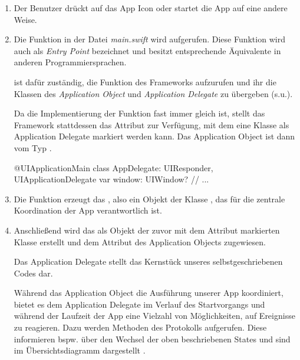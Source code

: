 \documentclass[parskip=half, final]{scrreprt}
\begin{document}
\begin{enumerate}
\item Der Benutzer drückt auf das App Icon oder startet die App auf eine andere Weise.
\item Die Funktion  in der Datei \emph{main.swift} wird aufgerufen. Diese Funktion wird auch als \emph{Entry Point} bezeichnet und besitzt entsprechende Äquivalente in anderen Programmiersprachen.

 ist dafür zuständig, die  Funktion des  Frameworks aufzurufen und ihr die Klassen des \emph{Application Object} und \emph{Application Delegate} zu übergeben (s.u.).

Da die Implementierung der  Funktion fast immer gleich ist, stellt das  Framework stattdessen das Attribut  zur Verfügung, mit dem eine Klasse als Application Delegate markiert werden kann. Das Application Object ist dann vom Typ .

\begin{swiftcode}
@UIApplicationMain
class AppDelegate: UIResponder, UIApplicationDelegate {
    var window: UIWindow?
    // ...
}
\end{swiftcode}

\item Die  Funktion erzeugt das , also ein Objekt der Klasse , das für die zentrale Koordination der App verantwortlich ist.

\item Anschließend wird das  als Objekt der zuvor mit dem  Attribut markierten Klasse erstellt und dem Attribut  des Application Objects zugewiesen.

Das Application Delegate stellt das Kernstück unseres selbstgeschriebenen Codes dar.

Während das Application Object die Ausführung unserer App koordiniert, bietet es dem Application Delegate im Verlauf des Startvorgangs und während der Laufzeit der App eine Vielzahl von Möglichkeiten, auf Ereignisse zu reagieren. Dazu werden  Methoden des  Protokolls aufgerufen. Diese informieren bspw. über den Wechsel der oben beschriebenen States und sind im Übersichtsdiagramm dargestellt .


\end{enumerate}
\end{document}

